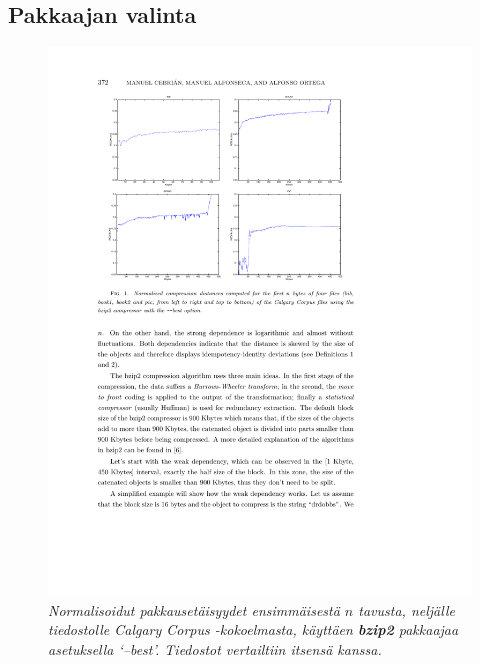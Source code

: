 \documentclass[12pt,finnish,final]{tktltiki2}
\theoremstyle{definition}
\theoremstyle{remark}
\begin{document}

  \subsection{Pakkaajan valinta} %
  \label{sub:pakkaajan_valinta}

    \begin{figure}[tb]
      \includegraphics[width=\textwidth]{img/bzip2-best}
      \caption{\emph{Normalisoidut pakkausetäisyydet ensimmäisestä $n$ tavusta, neljälle tiedostolle Calgary Corpus -kokoelmasta, käyttäen \textbf{bzip2} pakkaajaa asetuksella `--best'. Tiedostot vertailtiin itsensä kanssa.} \cite{cebrian2005common}}
      \label{fig:bzip2-best}
    \end{figure}
\end{document}
